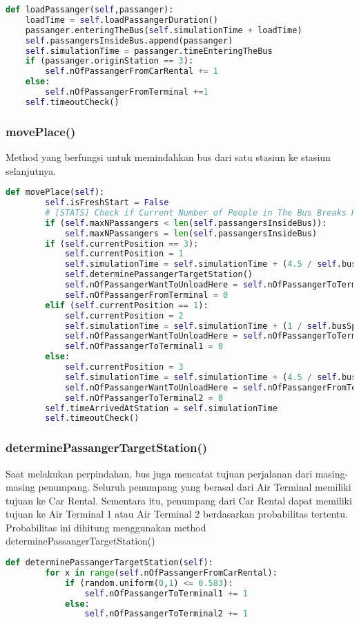 \documentclass{article}
\begin{document}
\begin{lstlisting}[language=Python]
def loadPassanger(self,passanger):
	loadTime = self.loadPassangerDuration()
	passanger.enteringTheBus(self.simulationTime + loadTime)
	self.passangersInsideBus.append(passanger)
	self.simulationTime = passanger.timeEnteringTheBus
	if (passanger.originStation == 3):
		self.nOfPassangerFromCarRental += 1
	else:
		self.nOfPassangerFromTerminal +=1
	self.timeoutCheck()
\end{lstlisting}

\subsubsection{movePlace()}
Method yang berfungsi untuk memindahkan bus dari satu stasiun ke stasiun selanjutnya. 
\begin{lstlisting}[language=Python]
def movePlace(self):
		self.isFreshStart = False	
		# [STATS] Check if Current Number of People in The Bus Breaks Record
		if (self.maxNPassangers < len(self.passangersInsideBus)):
			self.maxNPassangers = len(self.passangersInsideBus)
		if (self.currentPosition == 3):
			self.currentPosition = 1
			self.simulationTime = self.simulationTime + (4.5 / self.busSpeed * 3600)
			self.determinePassangerTargetStation()
			self.nOfPassangerWantToUnloadHere = self.nOfPassangerToTerminal1
			self.nOfPassangerFromTerminal = 0
		elif (self.currentPosition == 1):
			self.currentPosition = 2
			self.simulationTime = self.simulationTime + (1 / self.busSpeed * 3600)
			self.nOfPassangerWantToUnloadHere = self.nOfPassangerToTerminal2
			self.nOfPassangerToTerminal1 = 0
		else:
			self.currentPosition = 3
			self.simulationTime = self.simulationTime + (4.5 / self.busSpeed * 3600)
			self.nOfPassangerWantToUnloadHere = self.nOfPassangerFromTerminal
			self.nOfPassangerToTerminal2 = 0
		self.timeArrivedAtStation = self.simulationTime
		self.timeoutCheck()
\end{lstlisting}

\subsubsection{determinePassangerTargetStation()}
Saat melakukan perpindahan, bus juga mencatat tujuan perjalanan dari masing-masing penumpang.
Seluruh penumpang yang berasal dari Air Terminal memiliki tujuan ke Car Rental.
Sementara itu, penumpang dari Car Rental dapat memiliki tujuan ke Air Terminal 1 atau Air Terminal 2 berdasarkan
probabilitas tertentu. Probabilitas ini dihitung menggunakan method determinePassangerTargetStation()
\begin{lstlisting}[language=Python]
def determinePassangerTargetStation(self):
		for x in range(self.nOfPassangerFromCarRental):
			if (random.uniform(0,1) <= 0.583):
				self.nOfPassangerToTerminal1 += 1
			else:
				self.nOfPassangerToTerminal2 += 1
\end{lstlisting}
\end{document}
